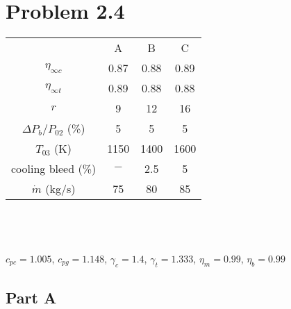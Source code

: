 \documentclass{article}
\begin{document}
\section*{Problem 2.4}
\begin{tabular}{cccc}
    & A & B & C \\
    $\eta_{\infty c}$ & 0.87 & 0.88 & 0.89 \\
    $\eta_{\infty t}$ & 0.89 & 0.88 & 0.88 \\
    $r$ & 9 & 12 & 16 \\
    $\Delta P_b/P_{02}$ (\%) & 5 & 5 & 5 \\
    $T_{03}$ (K) & 1150 & 1400 & 1600 \\
    cooling bleed (\%) & $-$ & 2.5 & 5 \\
    $\dot{m}$ (kg/s) & 75 & 80 & 85
\end{tabular} \\\\\\
$c_{pc}=1.005$, $c_{pg}=1.148$, $\gamma_c=1.4$, $\gamma_t=1.333$, $\eta_m=0.99$,
$\eta_b=0.99$

\subsection*{Part A}
\end{document}
